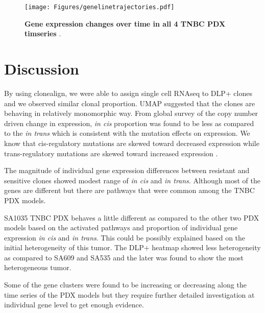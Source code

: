 \begin{figure}
\centering
 \texttt{[image: Figures/genelinetrajectories.pdf]}
	
\caption[Gene expression changes over time]
	{\small
	 \textbf{Gene expression changes over time in all 4 TNBC PDX timseries} .
	}
	\label{fig:genelinetrajectories}
\end{figure}



\section{Discussion}

By using clonealign, we were able to assign single cell RNAseq to  DLP+ clones and we observed similar clonal proportion. UMAP suggested that the clones are behaving in relatively monomorphic way. From global survey of the copy number driven change in expression, \textit{in cis} proportion was found to be less as compared to the \textit{in trans} which is consistent with the mutation effects on expression. We know that cis-regulatory mutations are skewed toward decreased expression while trans-regulatory mutations are skewed toward increased expression \cite{metzger2016contrasting}.

The magnitude of individual gene expression differences between resistant and sensitive clones showed modest range of \textit{in cis} and \textit{in trans}. Although most of the genes are different but there are pathways that were common among the TNBC PDX models. 

SA1035 TNBC PDX behaves a little different as compared to the other two PDX models based on the activated pathways and proportion of individual gene expression \textit{in cis} and \textit{in trans}. This could be possibly explained based on the initial heterogeneity of this tumor. The DLP+ heatmap showed less heterogeneity as compared to SA609 and SA535 and the later was found to show the most heterogeneous tumor.

Some of the gene clusters were found to be increasing or decreasing along the time series of the PDX models but they require further detailed investigation at individual gene level to get enough evidence.








